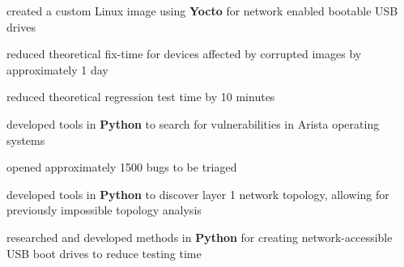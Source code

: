 \documentclass[a4paper]{style}
\begin{document}
\begin{minipage}[t]{0.5\textwidth}
\vspace{-1pt}
\begin{tightitemize}
    \item created a custom Linux image using \textbf{Yocto} for network enabled bootable USB drives
        \vspace{2pt}
        \begin{tightitemize}
            \item reduced theoretical fix-time for devices affected by corrupted images by approximately 1 day
            \item reduced theoretical regression test time by 10 minutes
        \end{tightitemize}
        \vspace{1pt}
    \item developed tools in \textbf{Python} to search for vulnerabilities in Arista operating systems
        \vspace{2pt}
        \begin{tightitemize}
            \item opened approximately 1500 bugs to be triaged
        \end{tightitemize}
\end{tightitemize}
\sectionspace{} %

\vspace{-1pt}
\begin{tightitemize}
    \item developed tools in \textbf{Python} to discover layer 1 network topology, allowing for previously impossible topology analysis
    \item researched and developed methods in \textbf{Python} for creating network-accessible USB boot drives to reduce testing time
\end{tightitemize}
\sectionspace{} %


\end{minipage}
\end{document}
